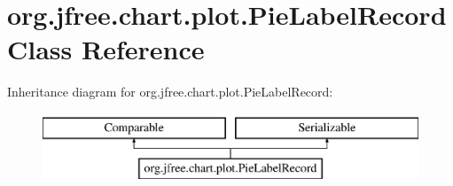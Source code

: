 \hypertarget{classorg_1_1jfree_1_1chart_1_1plot_1_1_pie_label_record}{}\section{org.\+jfree.\+chart.\+plot.\+Pie\+Label\+Record Class Reference}
\label{classorg_1_1jfree_1_1chart_1_1plot_1_1_pie_label_record}
Inheritance diagram for org.\+jfree.\+chart.\+plot.\+Pie\+Label\+Record\+:\begin{figure}[H]
\begin{center}
\leavevmode
\includegraphics[height=2.000000cm]{classorg_1_1jfree_1_1chart_1_1plot_1_1_pie_label_record}
\end{center}
\end{figure}
